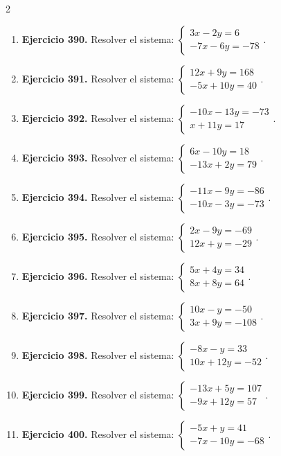 \documentclass[10pt,a4paper]{article}
\begin{document}
\begin{multicols}{2}
\begin{enumerate}[label=\textbf{\arabic*.}]
\item \textbf{Ejercicio 390.} Resolver el sistema: \(\begin{cases}3 x - 2 y=6\\- 7 x - 6 y=-78\end{cases}\).
\item \textbf{Ejercicio 391.} Resolver el sistema: \(\begin{cases}12 x + 9 y=168\\- 5 x + 10 y=40\end{cases}\).
\item \textbf{Ejercicio 392.} Resolver el sistema: \(\begin{cases}- 10 x - 13 y=-73\\x + 11 y=17\end{cases}\).
\item \textbf{Ejercicio 393.} Resolver el sistema: \(\begin{cases}6 x - 10 y=18\\- 13 x + 2 y=79\end{cases}\).
\item \textbf{Ejercicio 394.} Resolver el sistema: \(\begin{cases}- 11 x - 9 y=-86\\- 10 x - 3 y=-73\end{cases}\).
\item \textbf{Ejercicio 395.} Resolver el sistema: \(\begin{cases}2 x - 9 y=-69\\12 x + y=-29\end{cases}\).
\item \textbf{Ejercicio 396.} Resolver el sistema: \(\begin{cases}5 x + 4 y=34\\8 x + 8 y=64\end{cases}\).
\item \textbf{Ejercicio 397.} Resolver el sistema: \(\begin{cases}10 x - y=-50\\3 x + 9 y=-108\end{cases}\).
\item \textbf{Ejercicio 398.} Resolver el sistema: \(\begin{cases}- 8 x - y=33\\10 x + 12 y=-52\end{cases}\).
\item \textbf{Ejercicio 399.} Resolver el sistema: \(\begin{cases}- 13 x + 5 y=107\\- 9 x + 12 y=57\end{cases}\).
\item \textbf{Ejercicio 400.} Resolver el sistema: \(\begin{cases}- 5 x + y=41\\- 7 x - 10 y=-68\end{cases}\).
\end{enumerate}
\end{multicols}
\newpage
\end{document}
